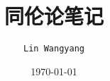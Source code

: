 \documentclass[Unicode,oneside]{book}
\title{同伦论笔记}
\author{\texttt{Lin Wangyang}}
\date{\today}
\theoremstyle{nonumberplain}
\begin{document}
	\maketitle
  \doclicenseThis%
  \tableofcontents
  
	



 
\end{document}
